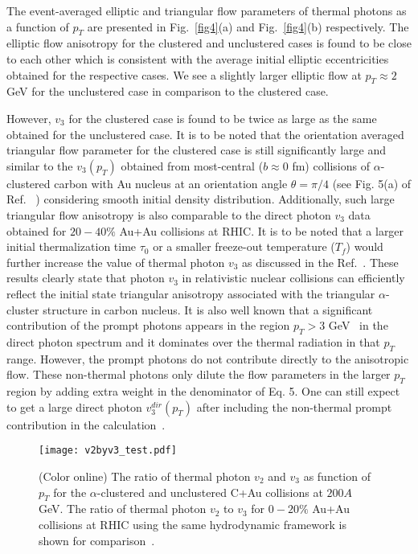 \documentclass[aps,prc,twocolumn,floatfix,12pts,superscriptaddress]{revtex4}
\begin{document}
The event-averaged elliptic and triangular flow parameters of thermal photons as a function of $ p_T$ are presented in Fig.~\ref{fig4}(a) and Fig.~\ref{fig4}(b) respectively. The elliptic flow anisotropy for the clustered and unclustered cases is found to be close to each other which is consistent with the average initial elliptic eccentricities obtained for the respective cases. We see a slightly larger elliptic flow at $ p_T \approx 2$ GeV for the unclustered case in comparison to the clustered case.

However, $v_3$ for the clustered case is found to be twice as large as the same obtained for the unclustered case.  It is to be noted that the orientation averaged triangular flow parameter for the clustered case is still significantly large and similar to the $ v_3(p_T)$  obtained from most-central ($ b\approx0$ fm) collisions of $\alpha$-clustered carbon with Au nucleus at an orientation angle $ \theta=\pi/4$ (see Fig. 5(a) of Ref. ~\cite{Dasgupta:2020orj}) considering smooth initial density distribution. Additionally, such large triangular flow anisotropy is also comparable to the direct photon $v_3$ data obtained for $20-40\%$ Au+Au collisions at RHIC. It is to be noted that a larger initial thermalization time $\tau_0$ or a smaller freeze-out temperature ($T_f$) would further increase the value of thermal photon $ v_3$ as discussed in the Ref.~\cite{Dasgupta:2020orj}. These results clearly state that photon $v_3$ in relativistic nuclear collisions can efficiently reflect the initial state triangular anisotropy associated with the triangular $\alpha$-cluster structure in carbon nucleus.  It is also well known that a significant contribution of the prompt photons appears in the region $ p_T >3$ GeV~\cite{Dasgupta:2020orj} in the direct photon spectrum and it dominates over the thermal radiation in that $p_T$ range. However, the prompt photons do not contribute directly to the anisotropic flow.  These non-thermal photons only dilute the flow parameters in the larger $p_T$ region by adding extra weight in the denominator of Eq. 5. One can still expect to get a large direct photon $ v^{dir}_3(p_T)$  after including the non-thermal prompt contribution in the calculation~\cite{Dasgupta:2020orj}.\\
\begin{figure}[htbp!]
	\centering
	{\texttt{[image: v2byv3\_test.pdf]}}
	\vspace{-3mm}
	\caption {(Color online) The ratio of thermal photon $v_2$ and $v_3$  as function of $ p_T$ for the $\alpha$-clustered and unclustered C+Au collisions at $200A$ GeV. The  ratio of thermal photon $v_2$ to $v_3$ for $0-20\%$ Au+Au collisions at RHIC using  the same hydrodynamic framework is shown for comparison~\cite{Adare:2015lcd}. }
	\label{fig5}
\end{figure}
\end{document}
